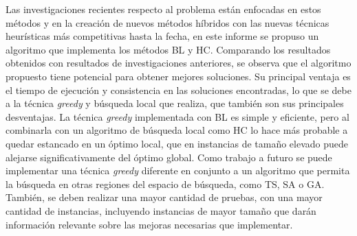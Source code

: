 \documentclass[letter, 10pt]{article}
\begin{document}
Las investigaciones recientes respecto al problema est\'an enfocadas en estos m\'etodos y en la creaci\'on de nuevos m\'etodos h\'ibridos con las nuevas t\'ecnicas heur\'isticas m\'as competitivas hasta la fecha, en este informe se propuso un algoritmo que implementa los m\'etodos BL y HC. Comparando los resultados obtenidos con resultados de investigaciones anteriores, se observa que el algoritmo propuesto tiene potencial para obtener mejores soluciones. Su principal ventaja es el tiempo de ejecuci\'on y consistencia en las soluciones encontradas, lo que se debe a la t\'ecnica \emph{greedy} y b\'usqueda local que realiza, que tambi\'en son sus principales desventajas. La t\'ecnica \emph{greedy} implementada con BL es simple y eficiente, pero al combinarla con un algoritmo de b\'usqueda local como HC lo hace m\'as probable a quedar estancado en un \'optimo local, que en instancias de tama\~no elevado puede alejarse significativamente del \'optimo global. Como trabajo a futuro se puede implementar una t\'ecnica \emph{greedy} diferente en conjunto a un algoritmo que permita la b\'usqueda en otras regiones del espacio de b\'usqueda, como TS, SA o GA. Tambi\'en, se deben realizar una mayor cantidad de pruebas, con una mayor cantidad de instancias, incluyendo instancias de mayor tama\~no que dar\'an informaci\'on relevante sobre las mejoras necesarias que implementar.



\end{document}
